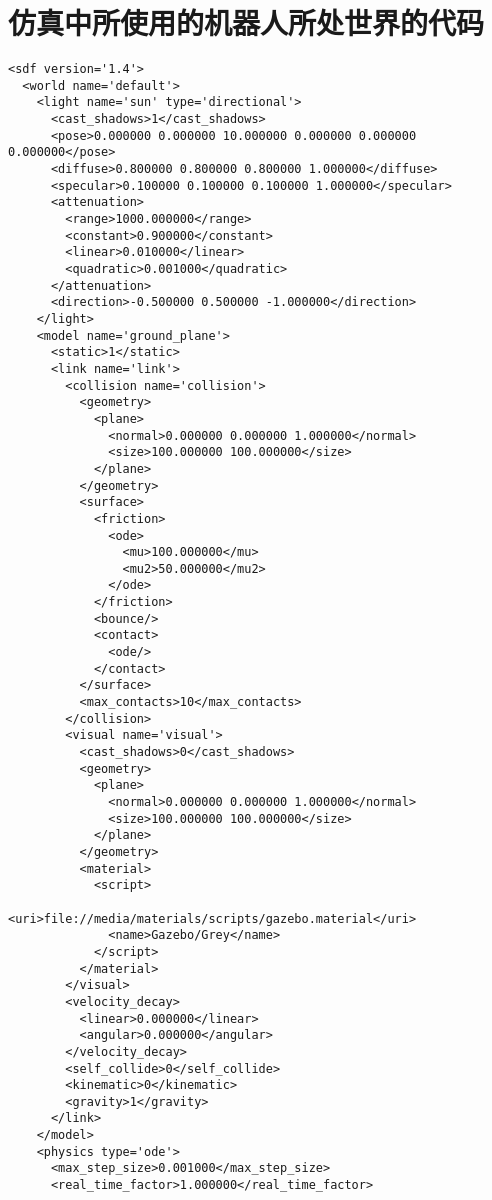 
\chapter{仿真中所使用的机器人所处世界的代码}
\label{chap:worldsdf}

\begin{lstlisting}
<sdf version='1.4'>
  <world name='default'>
    <light name='sun' type='directional'>
      <cast_shadows>1</cast_shadows>
      <pose>0.000000 0.000000 10.000000 0.000000 0.000000 0.000000</pose>
      <diffuse>0.800000 0.800000 0.800000 1.000000</diffuse>
      <specular>0.100000 0.100000 0.100000 1.000000</specular>
      <attenuation>
        <range>1000.000000</range>
        <constant>0.900000</constant>
        <linear>0.010000</linear>
        <quadratic>0.001000</quadratic>
      </attenuation>
      <direction>-0.500000 0.500000 -1.000000</direction>
    </light>
    <model name='ground_plane'>
      <static>1</static>
      <link name='link'>
        <collision name='collision'>
          <geometry>
            <plane>
              <normal>0.000000 0.000000 1.000000</normal>
              <size>100.000000 100.000000</size>
            </plane>
          </geometry>
          <surface>
            <friction>
              <ode>
                <mu>100.000000</mu>
                <mu2>50.000000</mu2>
              </ode>
            </friction>
            <bounce/>
            <contact>
              <ode/>
            </contact>
          </surface>
          <max_contacts>10</max_contacts>
        </collision>
        <visual name='visual'>
          <cast_shadows>0</cast_shadows>
          <geometry>
            <plane>
              <normal>0.000000 0.000000 1.000000</normal>
              <size>100.000000 100.000000</size>
            </plane>
          </geometry>
          <material>
            <script>
              <uri>file://media/materials/scripts/gazebo.material</uri>
              <name>Gazebo/Grey</name>
            </script>
          </material>
        </visual>
        <velocity_decay>
          <linear>0.000000</linear>
          <angular>0.000000</angular>
        </velocity_decay>
        <self_collide>0</self_collide>
        <kinematic>0</kinematic>
        <gravity>1</gravity>
      </link>
    </model>
    <physics type='ode'>
      <max_step_size>0.001000</max_step_size>
      <real_time_factor>1.000000</real_time_factor>

\end{lstlisting}
